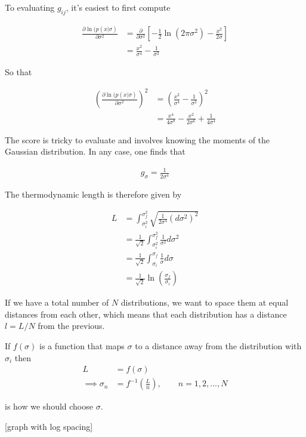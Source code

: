 \documentclass[10pt,a4paper]{article}
\begin{document}
To evaluating $g_{ij}$, it's easiest to first compute

\begin{align*}
\frac{\partial \ln (p(x|\sigma)}{\partial \sigma^2} &= \frac{\partial}{\partial\sigma^2}\left[ -\frac{1}{2}\ln(2\pi\sigma^2) -\frac{x^2}{2\sigma}  \right] \\
&= \frac{x^2}{\sigma^4} - \frac{1}{\sigma^2}
\end{align*}

So that

\begin{align}
\left(\frac{\partial \ln (p(x|\sigma)}{\partial \sigma^2}\right)^2 &= (\frac{x^2}{\sigma^4} - \frac{1}{\sigma^2})^2 \\
&= \frac{x^4}{4\sigma^8} - \frac{x^2}{2\sigma^6} + \frac{1}{4\sigma^4}
\end{align}

The score is tricky to evaluate and involves knowing the moments of the Gaussian distribution. In any case, one finds that

\begin{align}
g_{\sigma} = \frac{1}{2\sigma^4}
\end{align}

The thermodynamic length is therefore given by

\begin{align}
L &= \int_{\sigma_i^2}^{\sigma_f^2} \sqrt{\frac{1}{2\sigma^4} (d\sigma^2)^2} \\
&= \frac{1}{\sqrt{2}}\int_{\sigma_i^2}^{\sigma_f^2} \frac{1}{\sigma^2} d\sigma^2 \\
&= \frac{1}{\sqrt{2}}\int_{\sigma_i}^{\sigma_f} \frac{1}{\sigma} d\sigma \\
&= \frac{1}{\sqrt{2}}\ln\left(\frac{\sigma_f}{\sigma_i}\right)
\end{align}

If we have a total number of $N$ distributions, we want to space them at equal distances from each other, which means that each distribution has a distance $l = L/N$ from the previous.

If $f(\sigma)$ is a function that maps $\sigma$ to a distance away from the distribution with $\sigma_i$ then
\begin{align*}
L &= f(\sigma) \\
\implies \sigma_n &= f^{-1}\left(\frac{L}{n}\right), \quad \quad n=1,2,...,N
\end{align*}

is how we should choose $\sigma$.

[graph with log spacing]
\end{document}
